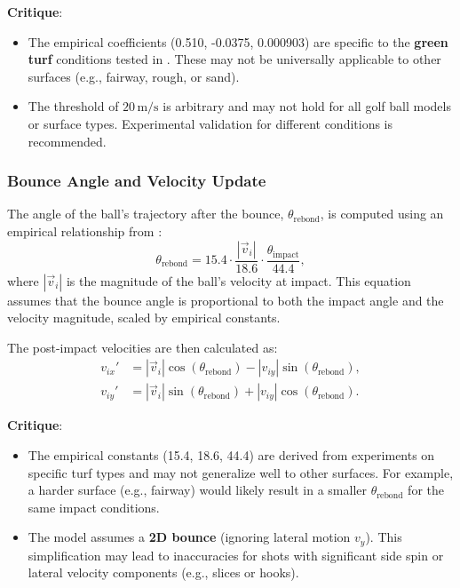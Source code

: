 \documentclass[10pt,a4paper]{report}
\begin{document}
\textbf{Critique}:
\begin{itemize}
    \item The empirical coefficients (0.510, -0.0375, 0.000903) are specific to 
    the \textbf{green turf} conditions tested in \cite{rwlc2010}. These may not be 
    universally applicable to other surfaces (e.g., fairway, rough, or sand).
    \item The threshold of $20 \, \text{m/s}$ is arbitrary and may not hold 
    for all golf ball models or surface types. Experimental validation for different conditions is recommended.
\end{itemize}

\bigskip
\subsubsection{Bounce Angle and Velocity Update}
\label{subsubsec:bounce_angle}

The angle of the ball's trajectory after the bounce, $\theta_{\text{rebond}}$, 
is computed using an empirical relationship from \cite{rwlc2010}:
\[
\theta_{\text{rebond}} = 15.4 \cdot \frac{|\vec{v}_i|}{18.6} \cdot \frac{\theta_{\text{impact}}}{44.4},
\]
where $|\vec{v}_i|$ is the magnitude of the ball's velocity at impact. 
This equation assumes that the bounce angle is proportional to both the impact 
angle and the velocity magnitude, scaled by empirical constants.

The post-impact velocities are then calculated as:
\[
\begin{aligned}
v_{ix}' &= |\vec{v}_i| \cos(\theta_{\text{rebond}}) - |v_{iy}| \sin(\theta_{\text{rebond}}), \\
v_{iy}' &= |\vec{v}_i| \sin(\theta_{\text{rebond}}) + |v_{iy}| \cos(\theta_{\text{rebond}}).
\end{aligned}
\]

\textbf{Critique}:
\begin{itemize}
    \item The empirical constants (15.4, 18.6, 44.4) are derived from experiments 
    on specific turf types and may not generalize well to other surfaces. 
    For example, a harder surface (e.g., fairway) would likely result in a smaller 
    $\theta_{\text{rebond}}$ for the same impact conditions.
    \item The model assumes a \textbf{2D bounce} (ignoring lateral motion $v_y$). 
    This simplification may lead to inaccuracies for shots with significant side 
    spin or lateral velocity components (e.g., slices or hooks).
\end{itemize}
\end{document}
